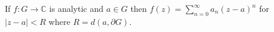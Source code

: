 If $f: G \to \mathbb{C}$ is analytic and $a \in G$ then $f(z) = \sum_{n=0}^{\infty} a_n(z-a)^n$ for $|z-a| < R$ where $R = d(a, \partial G)$.